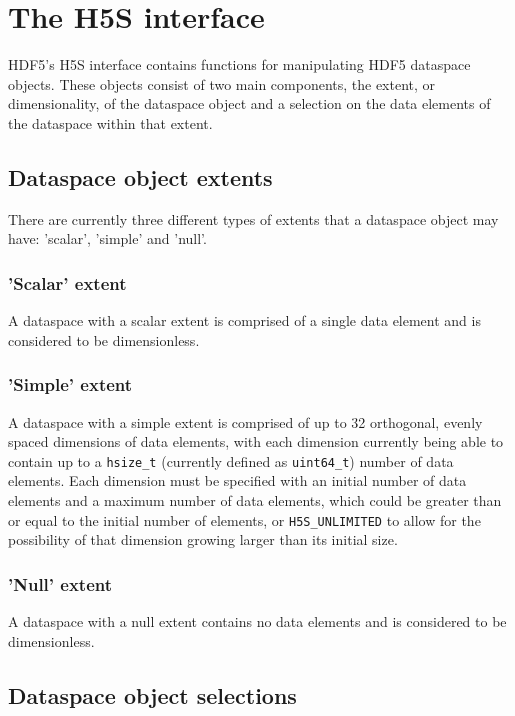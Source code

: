 \documentclass[../HDF5_RFC.tex]{subfiles}
\begin{document}
\section{The H5S interface}
\label{h5s_interface}

HDF5's H5S interface contains functions for manipulating HDF5 dataspace objects.
These objects consist of two main components, the extent, or dimensionality, of
the dataspace object and a selection on the data elements of the dataspace within
that extent.

\subsection{Dataspace object extents}

There are currently three different types of extents that a dataspace object may
have: 'scalar', 'simple' and 'null'.

\subsubsection{'Scalar' extent}

A dataspace with a scalar extent is comprised of a single data element and is
considered to be dimensionless.

\subsubsection{'Simple' extent}

A dataspace with a simple extent is comprised of up to 32 orthogonal, evenly spaced
dimensions of data elements, with each dimension currently being able to contain up
to a \texttt{hsize\_t} (currently defined as \texttt{uint64\_t}) number of data
elements. Each dimension must be specified with an initial number of data elements
and a maximum number of data elements, which could be greater than or equal to
the initial number of elements, or \texttt{H5S\_UNLIMITED} to allow for the possibility
of that dimension growing larger than its initial size.

\subsubsection{'Null' extent}

A dataspace with a null extent contains no data elements and is considered to be
dimensionless.

\subsection{Dataspace object selections}
\end{document}
